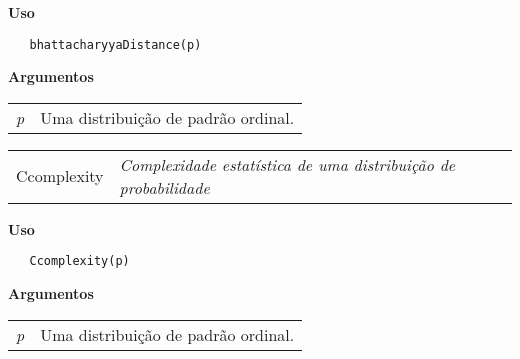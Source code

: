 \documentclass[12pt,letterpaper]{article}
\begin{document}
\vspace{-0.5cm}

\hrulefill  

\vspace{0.5cm}

\textbf{Uso}

\begin{lstlisting}
   bhattacharyyaDistance(p)
\end{lstlisting}

\vspace{0.5cm}

\textbf{Argumentos}

\begin{table}[!h]
\begin{center}
\begin{tabularx}{\textwidth}{X X}
\hspace{0.5cm} \textit{p} & Uma distribuição de padrão ordinal.\\
\end{tabularx}
\end{center}
\end{table} 

\hrulefill   

\begin{table}[!h]
\begin{center}
\begin{tabularx}{\textwidth}{ X X}
\hspace{0.5cm} Ccomplexity & \textit{Complexidade estatística de uma distribuição de probabilidade}\\
\end{tabularx}
\end{center}
\end{table} 

\vspace{-0.5cm}

\hrulefill  

\vspace{0.5cm}

\textbf{Uso}

\begin{lstlisting}
   Ccomplexity(p)
\end{lstlisting}

\vspace{0.5cm}

\textbf{Argumentos}

\begin{table}[!h]
\begin{center}
\begin{tabularx}{\textwidth}{X X}
\hspace{0.5cm} \textit{p} & Uma distribuição de padrão ordinal.\\
\end{tabularx}
\end{center}
\end{table} 
\end{document}
